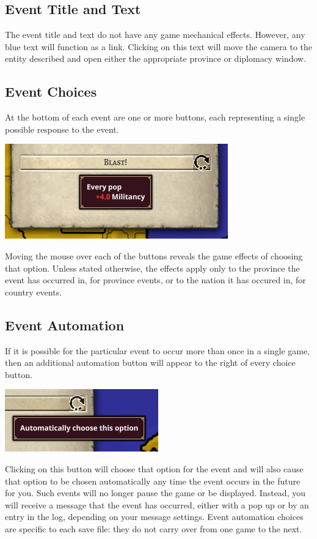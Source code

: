\subsection{Event Title and Text}
The event title and text do not have any game mechanical effects. However, any blue text will function as a link. Clicking on this text will move the camera to the entity described and open either the appropriate province or diplomacy window.
\subsection{Event Choices}
At the bottom of each event are one or more buttons, each representing a single possible response to the event.

\begin{center}
	\includegraphics{province_e_button.png}
\end{center}

Moving the mouse over each of the buttons reveals the game effects of choosing that option. Unless stated otherwise, the effects apply only to the province the event has occurred in, for province events, or to the nation it has occured in, for country events.
\subsection{Event Automation}
If it is possible for the particular event to occur more than once in a single game, then an additional automation button will appear to the right of every choice button.

\begin{center}
	\includegraphics{province_e_automate.png}
\end{center}

Clicking on this button will choose that option for the event and will also cause that option to be chosen automatically any time the event occurs in the future for you. Such events will no longer pause the game or be displayed. Instead, you will receive a message that the event has occurred, either with a pop up or by an entry in the log, depending on your message settings. Event automation choices are specific to each save file: they do not carry over from one game to the next.

